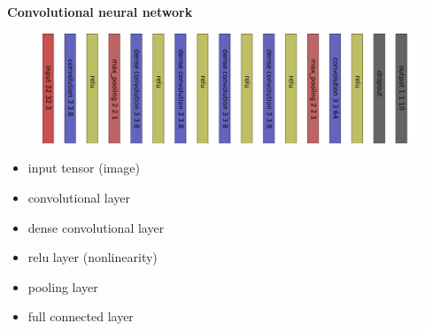 \documentclass[xcolor=dvipsnames]{beamer}
\begin{document}
\begin{frame}{\bf Convolutional neural network}


\begin{figure}
  \includegraphics[scale=0.2]{../../diagrams/cnn_architecture_example.png}
\end{figure}


\begin{itemize}
  \item input tensor (image)
  \item convolutional layer
  \item dense convolutional layer
  \item relu layer (nonlinearity)
  \item pooling layer
  \item full connected layer
\end{itemize}


\end{frame}
\end{document}
